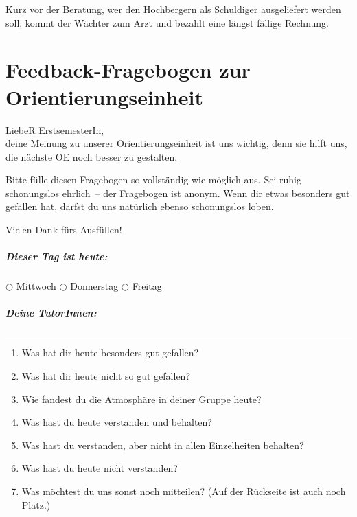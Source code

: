 Kurz vor der Beratung, wer den Hochbergern als Schuldiger ausgeliefert werden soll, kommt der Wächter zum Arzt und bezahlt eine längst fällige Rechnung.

\chapter{Feedback-Fragebogen zur Orientierungseinheit}
\label{fragebogen}
\medskip
LiebeR ErstsemesterIn,
\medskip
\\
deine Meinung zu unserer Orientierungseinheit ist uns wichtig, denn sie hilft uns, die nächste OE noch besser zu gestalten.

Bitte fülle diesen Fragebogen so vollständig wie möglich aus. Sei ruhig schonungslos ehrlich~-- der Fragebogen ist anonym. Wenn dir etwas besonders gut gefallen hat, darfst du uns natürlich ebenso schonungslos loben.

Vielen Dank fürs Ausfüllen!

\smallskip
\paragraph*{Dieser Tag ist heute:} $\bigcirc$ Mittwoch \hspace{1cm} $\bigcirc$ Donnerstag \hspace{1cm} $\bigcirc$ Freitag

\paragraph*{Deine TutorInnen:} \rule{10cm}{0,3pt}

\bigskip

\begin{enumerate}
\item Was hat dir heute besonders gut gefallen?
\vspace{1,0cm}
\item Was hat dir heute nicht so gut gefallen?
\vspace{1,0cm}
\item Wie fandest du die Atmosphäre in deiner Gruppe heute?
\vspace{1,0cm}
\item Was hast du heute verstanden und behalten?
\vspace{1,0cm}
\item Was hast du verstanden, aber nicht in allen Einzelheiten behalten?
\vspace{1,0cm}
\item Was hast du heute nicht verstanden?
\vspace{1,0cm}
\item Was möchtest du uns sonst noch mitteilen? (Auf der Rückseite ist auch noch Platz.)
\end{enumerate}

